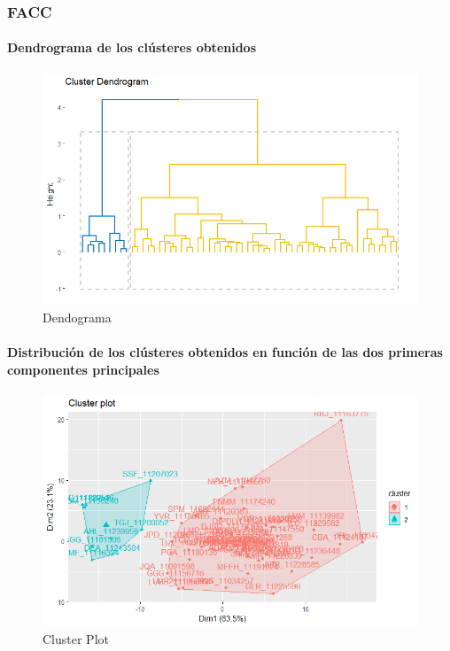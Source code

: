 \subsubsection{FACC}

\paragraph{Dendrograma de los clústeres obtenidos}

\begin{figure}[H]
    \centering
    \includegraphics[scale = 0.8]{img/06-1-ccf.png}
    \caption{Dendograma }
    \label{fig:ccf_den}
\end{figure}

\paragraph{Distribución de los clústeres obtenidos en función de las dos primeras componentes principales}

\begin{figure}[H]
    \centering
    \includegraphics[scale = 0.8]{img/06-2-ccf.png}
    \caption{Cluster Plot}
    \label{fig:ccf_pc}
\end{figure}

